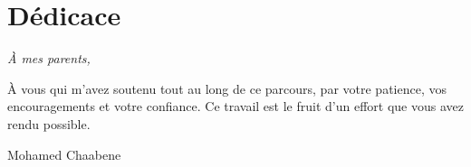 \chapter*{Dédicace}

\vspace*{2.2cm}
\begin{center}
\textit{À mes parents,}
\end{center}

\vspace{1.2cm}
\noindent
À vous qui m'avez soutenu tout au long de ce parcours, par votre patience, vos encouragements et votre confiance. Ce travail est le fruit d'un effort que vous avez rendu possible.

\vspace{1.4cm}
\begin{flushright}
Mohamed Chaabene
\end{flushright}
